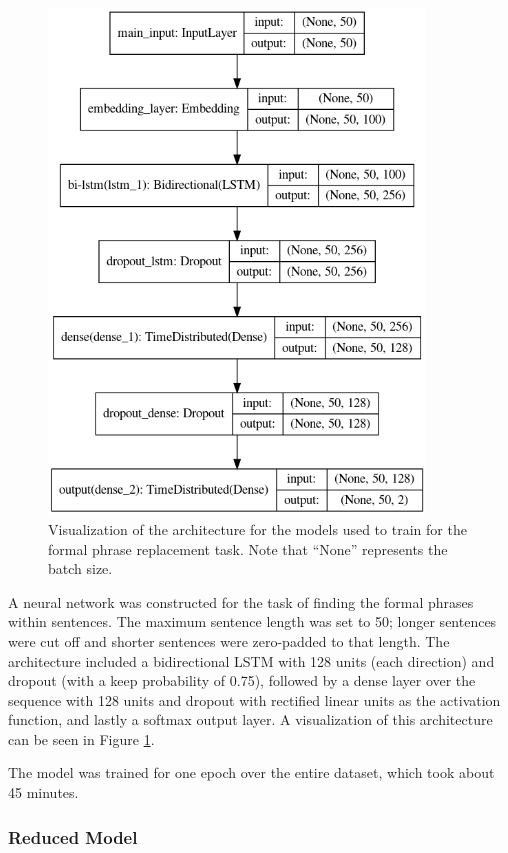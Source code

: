 \begin{figure}
    \centering
    \includegraphics[width = 10cm]{Figures/graph-lexical.png}
    \caption{Visualization of the architecture for the models used to train for the formal phrase replacement task. Note that ``None'' represents the batch size.}
    \label{fig:lexical-architecture}
\end{figure}

A neural network was constructed for the task of finding the formal phrases within sentences. The maximum sentence length was set to 50; longer sentences were cut off and shorter sentences were zero-padded to that length. The architecture included a bidirectional LSTM with 128 units (each direction) and dropout (with a keep probability of 0.75), followed by a dense layer over the sequence with 128 units and dropout with rectified linear units as the activation function, and lastly a softmax output layer. A visualization of this architecture can be seen in Figure \ref{fig:lexical-architecture}.

The model was trained for one epoch over the entire dataset, which took about 45 minutes.

\subsubsection{Reduced Model}

